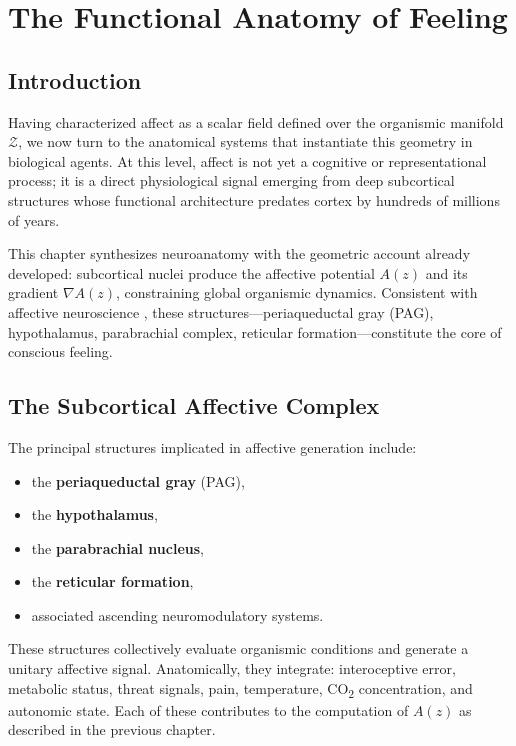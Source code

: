 \documentclass[12pt,oneside]{book}
\theoremstyle{plain}
\theoremstyle{definition}
\let\citep\parencite
\begin{document}
\chapter{The Functional Anatomy of Feeling}

\section{Introduction}

Having characterized affect as a scalar field defined over the organismic
manifold $\mathcal{Z}$, we now turn to the anatomical systems that instantiate
this geometry in biological agents. At this level, affect is not yet a
cognitive or representational process; it is a direct physiological signal
emerging from deep subcortical structures whose functional architecture
predates cortex by hundreds of millions of years.

This chapter synthesizes neuroanatomy with the geometric account already
developed:
subcortical nuclei produce the affective potential $A(z)$ and its gradient
$\nabla A(z)$, constraining global organismic dynamics.
Consistent with affective neuroscience
\citep{panksepp1998affective,panksepp2012archeology,solms2021hidden},
these structures—periaqueductal gray (PAG), hypothalamus, parabrachial
complex, reticular formation—constitute the core of conscious feeling.

\section{The Subcortical Affective Complex}

The principal structures implicated in affective generation include:

\begin{itemize}
    \item the \textbf{periaqueductal gray} (PAG),
    \item the \textbf{hypothalamus},
    \item the \textbf{parabrachial nucleus},
    \item the \textbf{reticular formation},
    \item associated ascending neuromodulatory systems.
\end{itemize}

These structures collectively evaluate organismic conditions and generate
a unitary affective signal.
Anatomically, they integrate:
interoceptive error,
metabolic status,
threat signals,
pain,
temperature,
CO\textsubscript{2} concentration,
and autonomic state.
Each of these contributes to the computation of $A(z)$ as described in the
previous chapter.
\end{document}
